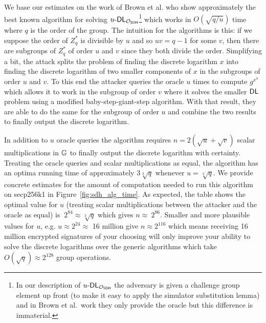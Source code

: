 We base our estimates on the work of Brown et al.\cite{SDHP} who show approximately the best known algorithm for solving $u\text{-}\textsf{DL}_{\mathcal{O}_{\textsf{SDH}}}$\footnote{In our description of $u\text{-}\textsf{DL}_{\mathcal{O}_{\textsf{SDH}}}$ the adversary is given a challenge group element up front (to make it easy to apply the simulator substitution lemma) and in Brown et al.\ work they only provide the oracle but this difference is immaterial.} which works in $O(\sqrt{q/u})$ time where $q$ is the order of the group.
The intuition for the algorithms is this: if we suppose the order of $Z^*_q$ is divisible by $u$ and so $uv = q-1$ for some $v$, then there are subgroups of $Z^*_q$ of order $u$ and $v$ since they both divide the order.
Simplifying a bit, the attack splits the problem of finding the discrete logarithm $x$ into finding the discrete logarithm of two smaller components of $x$ in the subgroups of order $u$ and $v$.
To this end the attacker queries the oracle $u$ times to compute $g^{x^u}$ which allows it to work in the subgroup of order $v$ where it solves the smaller $\textsf{DL}$ problem using a modified baby-step-giant-step algorithm.
With that result, they are able to do the same for the subgroup of order $u$ and combine the two results to finally output the discrete logarithm.

In addition to $u$ oracle queries the algorithm requires $n = 2(\sqrt{u} + \sqrt{v})$ scalar multiplications in $\mathbb{G}$ to finally output the discrete logarithm with certainty.
Treating the oracle queries and scalar multiplications as equal, the algorithm has an optima running time of approximately $3\sqrt[3]{q}$ whenever $u = \sqrt[3]{q}$.
We provide concrete estimates for the amount of computation needed to run this algorithm on secp256k1 in Figure~\ref{fig:sdh_alg_time}.
As expected, the table shows the optimal value for $u$ (treating scalar multiplications between the attacker and the oracle as equal) is $~2^{84} \approx \sqrt[3]{q}$ which gives $n \approx ~2^{86}$.
Smaller and more plausible values for $u$, e.g. $u \approx 2^{24} \approx$ 16 million give $n \approx 2^{116}$ which means receiving 16 million encrypted signatures of your choosing will only improve your ability to solve the discrete logarithms over the generic algorithms which take $O(\sqrt{q}) \approx 2^{128}$ group operations.

